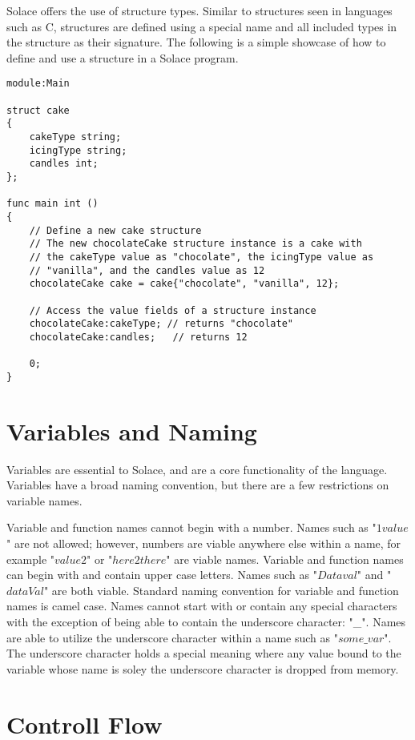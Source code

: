 \documentclass{article}
\begin{document}
Solace offers the use of structure types. Similar to structures seen in languages such as C, structures
are defined using a special name and all included types in the structure as their signature. The 
following is a simple showcase of how to define and use a structure in a Solace program.

\begin{lstlisting}
module:Main

struct cake
{
	cakeType string;
	icingType string;
	candles int;
};

func main int ()
{
	// Define a new cake structure
	// The new chocolateCake structure instance is a cake with
	// the cakeType value as "chocolate", the icingType value as
	// "vanilla", and the candles value as 12
	chocolateCake cake = cake{"chocolate", "vanilla", 12};
	
	// Access the value fields of a structure instance
	chocolateCake:cakeType; // returns "chocolate"
	chocolateCake:candles;   // returns 12
	
	0;
}

\end{lstlisting}

\section{Variables and Naming}

Variables are essential to Solace, and are a core functionality of the language. Variables have a broad
naming convention, but there are a few restrictions on variable names.

Variable and function names cannot begin with a number. Names such as "$1value$" are not allowed; however,
numbers are viable anywhere else within a name, for example "$value2$" or "$here2there$" are viable 
names. Variable and function names can begin with and contain upper case letters. Names such as "$Dataval$"
and "$dataVal$" are both viable. Standard naming convention for variable and function names is camel case.
Names cannot start with or contain any special characters with the exception of being able to 
contain the underscore character: "\_". Names are able to utilize the underscore character within a name such
as "$some\_var$". The underscore character holds a special meaning where any value bound to the variable
whose name is soley the underscore character is dropped from memory.

\section{Controll Flow}
\end{document}
